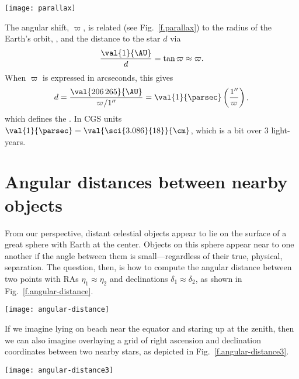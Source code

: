 \begin{figure*}[htb]
\texttt{[image: parallax]}
\caption[The parallax angle of a star]{The parallax angle $\varpi$ of a star induced by Earth's motion around the Sun.}
\label{f.parallax}
\end{figure*}

The angular shift, $\varpi$, is related (see Fig.~\ref{f.parallax}) to the radius of the Earth's orbit, , and the distance to the star $d$ via
\[
\frac{\val{1}{\AU}}{d} = \tan\varpi \approx \varpi.
\]
When $\varpi$ is expressed in arcseconds, this gives
\begin{equation}\label{e.parallax}
d = \frac{\val{206\,265}{\AU}}{\varpi/1''} = \val{1}{\parsec}\left(\frac{1''}{\varpi}\right) ,
\end{equation}
which defines the .  In CGS units $\val{1}{\parsec} = \val{\sci{3.086}{18}}{\cm}$, which is a bit over 3 light-years.

\section{Angular distances between nearby objects}

From our perspective, distant celestial objects appear to lie on the surface of a great sphere with Earth at the center. Objects on this sphere appear near to one another if the angle between them is small---regardless of their true, physical, separation. The question, then, is how to compute the angular distance between two points with RAs $\eta_{1} \approx \eta_{2}$ and declinations $\delta_{1}\approx\delta_{2}$, as shown in Fig.~\ref{f.angular-distance}.
\begin{marginfigure}
\texttt{[image: angular-distance]}
\caption[Angular distance between two points on a sphere]{Two locations on the sphere separated by a distance $\theta$.}
\label{f.angular-distance}
\end{marginfigure}

If we imagine lying on beach near the equator and staring up at the zenith, then we can also imagine overlaying a grid of right ascension and declination coordinates between two nearby stars, as depicted in Fig.~\ref{f.angular-distance3}.
\begin{marginfigure}
\texttt{[image: angular-distance3]}
\caption[Angular distance between two nearby points near the celestial equator]{Angular distance between two nearby points near the celestial equator.}
\label{f.angular-distance3}
\end{marginfigure}

